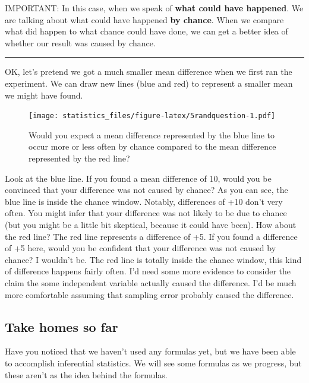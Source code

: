\documentclass[]{book}
\begin{document}
IMPORTANT: In this case, when we speak of \textbf{what could have happened}. We are talking about what could have happened \textbf{by chance}. When we compare what did happen to what chance could have done, we can get a better idea of whether our result was caused by chance.

\begin{center}\rule{0.5\linewidth}{0.5pt}\end{center}

OK, let's pretend we got a much smaller mean difference when we first ran the experiment. We can draw new lines (blue and red) to represent a smaller mean we might have found.

\begin{figure}
\centering
\texttt{[image: statistics\_files/figure-latex/5randquestion-1.pdf]}
\caption{\label{fig:5randquestion}Would you expect a mean difference represented by the blue line to occur more or less often by chance compared to the mean difference represented by the red line?}
\end{figure}

Look at the blue line. If you found a mean difference of 10, would you be convinced that your difference was not caused by chance? As you can see, the blue line is inside the chance window. Notably, differences of +10 don't very often. You might infer that your difference was not likely to be due to chance (but you might be a little bit skeptical, because it could have been). How about the red line? The red line represents a difference of +5. If you found a difference of +5 here, would you be confident that your difference was not caused by chance? I wouldn't be. The red line is totally inside the chance window, this kind of difference happens fairly often. I'd need some more evidence to consider the claim the some independent variable actually caused the difference. I'd be much more comfortable assuming that sampling error probably caused the difference.

\hypertarget{take-homes-so-far}{%
\subsection{Take homes so far}\label{take-homes-so-far}}

Have you noticed that we haven't used any formulas yet, but we have been able to accomplish inferential statistics. We will see some formulas as we progress, but these aren't as the idea behind the formulas.
\end{document}
